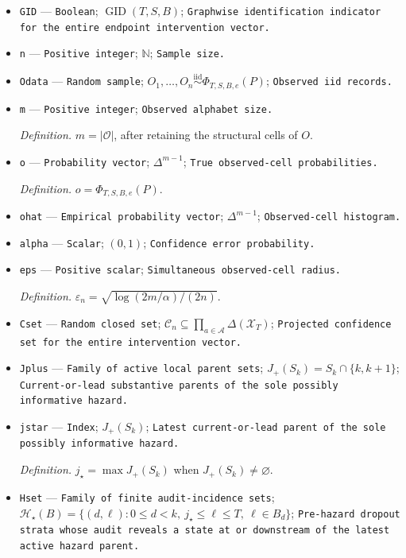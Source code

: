 \documentclass{article}
\begin{document}
\begin{itemize}
  \item \texttt{GID} --- \texttt{Boolean}; \(\operatorname{GID}(T,S,B)\); \texttt{Graphwise identification indicator for the entire endpoint intervention vector.}
  \item \texttt{n} --- \texttt{Positive integer}; \(\mathbb N\); \texttt{Sample size.}
  \item \texttt{Odata} --- \texttt{Random sample}; \(O_1,\ldots,O_n\overset{\mathrm{iid}}{\sim}\Phi_{T,S,B,e}(P)\); \texttt{Observed iid records.}
  \item \texttt{m} --- \texttt{Positive integer}; \texttt{Observed alphabet size.}
  \par\smallskip\noindent\emph{Definition.} \(m=|\mathcal O|\), after retaining the structural cells of \(O\).
  \item \texttt{o} --- \texttt{Probability vector}; \(\Delta^{m-1}\); \texttt{True observed-\allowbreak{}cell probabilities.}
  \par\smallskip\noindent\emph{Definition.} \(o=\Phi_{T,S,B,e}(P)\).
  \item \texttt{ohat} --- \texttt{Empirical probability vector}; \(\Delta^{m-1}\); \texttt{Observed-\allowbreak{}cell histogram.}
  \item \texttt{alpha} --- \texttt{Scalar}; \((0,1)\); \texttt{Confidence error probability.}
  \item \texttt{eps} --- \texttt{Positive scalar}; \texttt{Simultaneous observed-\allowbreak{}cell radius.}
  \par\smallskip\noindent\emph{Definition.} \(\varepsilon_n=\sqrt{\log(2m/\alpha)/(2n)}\).
  \item \texttt{Cset} --- \texttt{Random closed set}; \(\mathcal C_n\subseteq\prod_{a\in\mathcal A}\Delta(\mathcal X_T)\); \texttt{Projected confidence set for the entire intervention vector.}
  \item \texttt{Jplus} --- \texttt{Family of active local parent sets}; \(J_+(S_k)=S_k\cap\{k,k+1\}\); \texttt{Current-\allowbreak{}or-\allowbreak{}lead substantive parents of the sole possibly informative hazard.}
  \item \texttt{jstar} --- \texttt{Index}; \(J_+(S_k)\); \texttt{Latest current-\allowbreak{}or-\allowbreak{}lead parent of the sole possibly informative hazard.}
  \par\smallskip\noindent\emph{Definition.} \(j_\star=\max J_+(S_k)\) when \(J_+(S_k)\ne\varnothing\).
  \item \texttt{Hset} --- \texttt{Family of finite audit-\allowbreak{}incidence sets}; \(\mathcal H_\star(B)=\{(d,\ell):0\le d<k,\ j_\star\le\ell\le T,\ \ell\in B_d\}\); \texttt{Pre-\allowbreak{}hazard dropout strata whose audit reveals a state at or downstream of the latest active hazard parent.}

\end{itemize}
\end{document}
